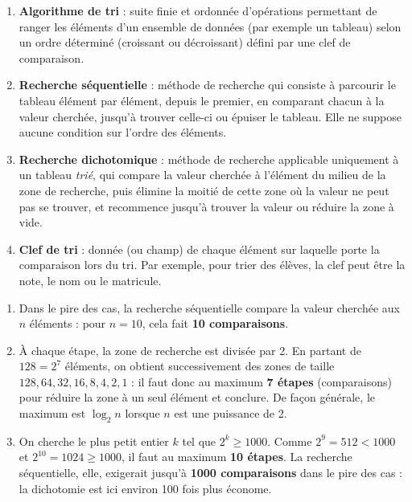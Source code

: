\documentclass[11pt]{article}
\begin{document}
\begin{corrige}
\begin{enumerate}
\item \textbf{Algorithme de tri} : suite finie et ordonnée d'opérations permettant de ranger les éléments d'un ensemble de données (par exemple un tableau) selon un ordre déterminé (croissant ou décroissant) défini par une clef de comparaison.
\item \textbf{Recherche séquentielle} : méthode de recherche qui consiste à parcourir le tableau élément par élément, depuis le premier, en comparant chacun à la valeur cherchée, jusqu'à trouver celle-ci ou épuiser le tableau. Elle ne suppose aucune condition sur l'ordre des éléments.
\item \textbf{Recherche dichotomique} : méthode de recherche applicable uniquement à un tableau \emph{trié}, qui compare la valeur cherchée à l'élément du milieu de la zone de recherche, puis élimine la moitié de cette zone où la valeur ne peut pas se trouver, et recommence jusqu'à trouver la valeur ou réduire la zone à vide.
\item \textbf{Clef de tri} : donnée (ou champ) de chaque élément sur laquelle porte la comparaison lors du tri. Par exemple, pour trier des élèves, la clef peut être la note, le nom ou le matricule.
\end{enumerate}
\end{corrige}

\begin{corrige}
\begin{enumerate}
\item Dans le pire des cas, la recherche séquentielle compare la valeur cherchée aux $n$ éléments : pour $n = 10$, cela fait \textbf{10 comparaisons}.
\item À chaque étape, la zone de recherche est divisée par 2. En partant de $128 = 2^7$ éléments, on obtient successivement des zones de taille $128, 64, 32, 16, 8, 4, 2, 1$ : il faut donc au maximum \textbf{7 étapes} (comparaisons) pour réduire la zone à un seul élément et conclure. De façon générale, le maximum est $\log_2 n$ lorsque $n$ est une puissance de 2.
\item On cherche le plus petit entier $k$ tel que $2^k \geq 1000$. Comme $2^9 = 512 < 1000$ et $2^{10} = 1024 \geq 1000$, il faut au maximum \textbf{10 étapes}. La recherche séquentielle, elle, exigerait jusqu'à \textbf{1000 comparaisons} dans le pire des cas : la dichotomie est ici environ 100 fois plus économe.
\end{enumerate}
\end{corrige}
\end{document}
